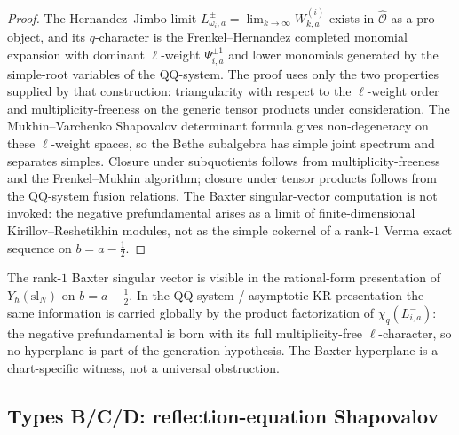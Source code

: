 \begin{proof}
The Hernandez--Jimbo limit
$L^\pm_{\omega_i,a} = \lim_{k\to\infty} W^{(i)}_{k,a}$ exists in
$\widehat{\mathcal{O}}$ as a pro-object, and its $q$-character
is the Frenkel--Hernandez completed monomial expansion with dominant
$\ell$-weight $\Psi_{i,a}^{\pm1}$ and lower monomials generated by the
simple-root variables of the QQ-system. The proof uses only the two
properties supplied by that construction: triangularity with respect
to the $\ell$-weight order and multiplicity-freeness on the generic
tensor products under consideration. The Mukhin--Varchenko
Shapovalov determinant formula gives non-degeneracy on these
$\ell$-weight spaces, so the Bethe subalgebra has simple joint
spectrum and separates simples. Closure under subquotients follows
from multiplicity-freeness and the Frenkel--Mukhin algorithm; closure
under tensor products follows from the QQ-system fusion relations. The
Baxter singular-vector computation is not invoked: the negative
prefundamental arises as a limit of finite-dimensional
Kirillov--Reshetikhin modules, not as the simple cokernel of a
rank-$1$ Verma exact sequence on $b = a - \tfrac12$.
\end{proof}

\begin{remark}
\label{rem:type-A-no-hyperplane}
The rank-$1$ Baxter singular vector is visible in the
rational-form presentation of $Y_\hbar(\mathrm{sl}_N)$ on
$b = a - \tfrac12$. In the QQ-system / asymptotic KR presentation
the same information is carried globally by the product
factorization of $\chi_q(L^-_{i,a})$: the negative prefundamental
is born with its full multiplicity-free $\ell$-character, so no
hyperplane is part of the generation hypothesis. The Baxter
hyperplane is a chart-specific witness, not a universal obstruction.
\end{remark}

\subsection{Types B/C/D: reflection-equation Shapovalov}

